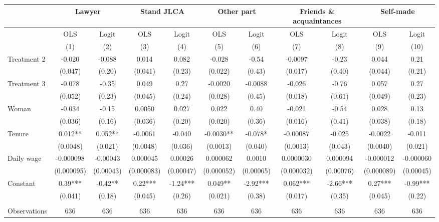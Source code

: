 \begin{tabular}{lcccccccccc}
\toprule
      & \multicolumn{2}{c}{Lawyer} & \multicolumn{2}{c}{Stand JLCA} & \multicolumn{2}{c}{Other part} & \multicolumn{2}{c}{Friends \& acquaintances} & \multicolumn{2}{c}{Self-made} \\
\midrule
\midrule
      & OLS   & Logit & OLS   & Logit & OLS   & Logit & OLS   & Logit & OLS   & Logit \\
\midrule
      & (1)   & (2)   & (3)   & (4)   & (5)   & (6)   & (7)   & (8)   & (9)   & (10) \\
\midrule
\midrule
Treatment 2 & -0.020 & -0.088 & 0.014 & 0.082 & -0.028 & -0.54 & -0.0097 & -0.23 & 0.044 & 0.21 \\
      & (0.047) & (0.20) & (0.041) & (0.23) & (0.022) & (0.43) & (0.017) & (0.40) & (0.044) & (0.21) \\
Treatment 3 & -0.078 & -0.35 & 0.049 & 0.27  & -0.0020 & -0.0088 & -0.026 & -0.76 & 0.057 & 0.27 \\
      & (0.052) & (0.23) & (0.045) & (0.24) & (0.028) & (0.45) & (0.018) & (0.61) & (0.049) & (0.23) \\
Woman & -0.034 & -0.15 & 0.0050 & 0.027 & 0.022 & 0.40  & -0.021 & -0.54 & 0.028 & 0.13 \\
      & (0.036) & (0.16) & (0.036) & (0.20) & (0.020) & (0.36) & (0.016) & (0.41) & (0.038) & (0.18) \\
Tenure & 0.012** & 0.052** & -0.0061 & -0.040 & -0.0030** & -0.078* & -0.00087 & -0.025 & -0.0022 & -0.011 \\
      & (0.0048) & (0.021) & (0.0048) & (0.036) & (0.0013) & (0.040) & (0.0013) & (0.043) & (0.0040) & (0.021) \\
Daily wage & -0.000098 & -0.00043 & 0.000045 & 0.00026 & 0.000062 & 0.0010 & 0.0000030 & 0.000094 & -0.000012 & -0.000060 \\
      & (0.000095) & (0.00043) & (0.000083) & (0.00047) & (0.000052) & (0.00065) & (0.000032) & (0.00076) & (0.000089) & (0.00045) \\
Constant & 0.39*** & -0.42** & 0.22*** & -1.24*** & 0.049** & -2.92*** & 0.062*** & -2.66*** & 0.27*** & -0.99*** \\
      & (0.041) & (0.18) & (0.045) & (0.26) & (0.021) & (0.38) & (0.017) & (0.35) & (0.045) & (0.22) \\
      &       &       &       &       &       &       &       &       &       &  \\
\midrule
Observations  & 636   & 636   & 636   & 636   & 636   & 636   & 636   & 636   & 636   & 636 \\

\end{tabular}
